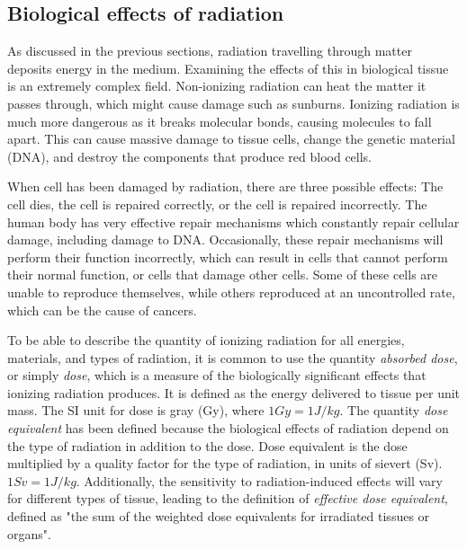 \documentclass[../main/thesis.tex]{subfiles}
\begin{document}
\subsection{Biological effects of radiation}
\label{t-bio}
As discussed in the previous sections, radiation travelling through matter deposits energy in the medium. Examining the effects of this in biological tissue is an extremely complex field. Non-ionizing radiation can heat the matter it passes through, which might cause damage such as sunburns. Ionizing radiation is much more dangerous as it breaks molecular bonds, causing molecules to fall apart. This can cause massive damage to tissue cells, change the genetic material (DNA), and destroy the components that produce red blood cells. \citep[chap. 43]{UniversityPhysics} 

When cell has been damaged by radiation, there are three possible effects: The cell dies, the cell is repaired correctly, or the cell is repaired incorrectly. The human body has very effective repair mechanisms which constantly repair cellular damage, including damage to DNA. Occasionally, these repair mechanisms will perform their function incorrectly, which can result in cells that cannot perform their normal function, or cells that damage other cells. Some of these cells are unable to reproduce themselves, while others reproduced at an uncontrolled rate, which can be the cause of cancers.\citetext{\citeauthor{jlab}}

To be able to describe the quantity of ionizing radiation for all energies, materials, and types of radiation, it is common to use the quantity \textit{absorbed dose}, or simply \textit{dose}, which is a measure of the biologically significant effects that ionizing radiation produces. It is defined as the energy delivered to tissue per unit mass. The SI unit for dose is gray (Gy), where $1 Gy = 1 J/kg$. \citep[chap. 8]{Khan} The quantity \textit{dose equivalent} has been defined because the biological effects of radiation depend on the type of radiation in addition to the dose. Dose equivalent is the dose multiplied by a quality factor for the type of radiation, in units of sievert (Sv). $1 Sv = 1 J/kg$. Additionally, the sensitivity to radiation-induced effects will vary for different types of tissue, leading to the definition of \textit{effective dose equivalent}, defined as "the sum of the weighted dose equivalents for irradiated tissues or organs". \citep[chap. 16]{Khan} 

\end{document}
